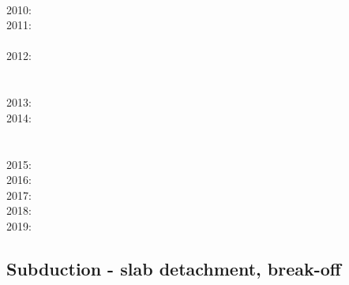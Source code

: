       \cite{huby09}\\
2010: \cite{hagr10}\cite{lobh10}\cite{mamb10}\cite{camg10}\cite{casm10}\cite{ligb10}\cite{stfc10}
      \cite{moyb10}\cite{zhst10}\cite{qusp10}\cite{moht10}\cite{leki10}\\
2011: \cite{lixg11}\cite{list11}\cite{bubj11}\cite{bagw11b}\cite{cafz11}\cite{geme11}\cite{qube11}\\
      \cite{blgg11}\cite{gery11b}\cite{leki11}\\
2012: \cite{anwb12}\cite{jahu12}\cite{jabi12}\cite{jabk12}\cite{lixg12}\cite{grpy12}\cite{grpy12b}\\
      \cite{ronb12}\cite{tebu12}\cite{thka12}\cite{bova12}\cite{civs12}\cite{camo12}\cite{cafa12} \\
      \cite{gebk12}\cite{liri12}\cite{beva12}\cite{uegb12}\cite{bija12}\\
2013: \cite{nabg13}\cite{hage13}\cite{ancv13}\cite{namu13}\cite{yosh13}\cite{zhgt13}\cite{lixg13} 
      \cite{jabr13}\cite{izht13}\cite{luws13}\cite{dusc13}\cite{tibb13}\cite{bubj13}\cite{scmo13} 
      \cite{fuob13}\cite{magc13}\cite{musi13}\cite{mibg13}\cite{grpy13}\cite{vagd13a}\cite{vagd13b}
      \cite{cavg13}\cite{vocg13}\cite{qula13}\cite{bugu13}\\
2014: \cite{robn14}\cite{hond14}\cite{ronc14}\cite{mobm14}\cite{famc14}\cite{fogm14}\cite{frba14} \\
      \cite{gagd14}\cite{voge14}\cite{voge14b}\cite{lidr14}\cite{bocj04}\cite{bagb14}\cite{stjm14}\\
      \cite{basc14}\cite{vamd14}\cite{kile14}\cite{jahm14}\cite{bufa14}\cite{bufy14b}\\
2015: \cite{bemm15}\cite{bomv15}\cite{bogf15}\cite{ceag15}\cite{kifr15}\cite{vami15}\cite{dali15}\\
2016: \cite{tomy16}\cite{gukt16}\cite{robn16}\cite{mavm16}\\
2017: \cite{kicf17}\cite{sche17}\cite{pest17}\cite{vomc17}\cite{majf17}\cite{yabr17}\\
2018: \cite{yamz18}\cite{crli18}\\
2019: \cite{magn19}\cite{mavb19}\cite{scvm19}\cite{cakc19}

\subsection*{Subduction - slab detachment, break-off}
 

